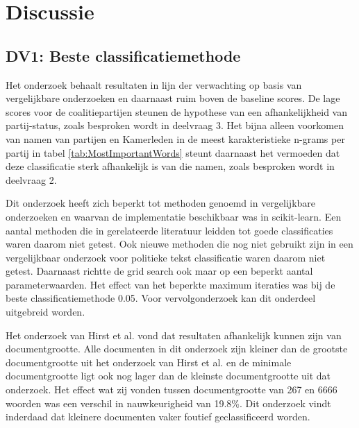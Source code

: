 \section{Discussie}
\subsection{DV1: Beste classificatiemethode}
Het onderzoek behaalt resultaten in lijn der verwachting op basis van vergelijkbare onderzoeken en daarnaast ruim boven de baseline scores. De lage scores voor de coalitiepartijen steunen de hypothese van een afhankelijkheid van partij-status, zoals besproken wordt in deelvraag 3. Het bijna alleen voorkomen van namen van partijen en Kamerleden in de meest karakteristieke n-grams per partij in tabel \ref{tab:MostImportantWords} steunt daarnaast het vermoeden dat deze classificatie sterk afhankelijk is van die namen, zoals besproken wordt in deelvraag 2.\par
Dit onderzoek heeft zich beperkt tot methoden genoemd in vergelijkbare onderzoeken en waarvan de implementatie beschikbaar was in scikit-learn. Een aantal methoden die in gerelateerde literatuur leidden tot goede classificaties waren daarom niet getest. Ook nieuwe methoden die nog niet gebruikt zijn in een vergelijkbaar onderzoek voor politieke tekst classificatie waren daarom niet getest. Daarnaast richtte de grid search ook maar op een beperkt aantal parameterwaarden. Het effect van het beperkte maximum iteraties was bij de beste classificatiemethode 0.05. Voor vervolgonderzoek kan dit onderdeel uitgebreid worden. \par
Het onderzoek van Hirst et al. vond dat resultaten afhankelijk kunnen zijn van documentgrootte. Alle documenten in dit onderzoek zijn kleiner dan de grootste documentgrootte uit het onderzoek van Hirst et al. en de minimale documentgrootte ligt ook nog lager dan de kleinste documentgrootte uit dat onderzoek. Het effect wat zij vonden tussen documentgrootte van 267 en 6666 woorden was een verschil in nauwkeurigheid van 19.8\%. Dit onderzoek vindt inderdaad dat kleinere documenten vaker foutief geclassificeerd worden.
